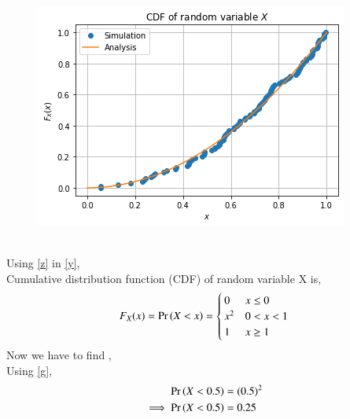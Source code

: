 \documentclass[journal,12pt,twocolumn]{IEEEtran}
\begin{document}
\begin{figure}[htp]
    \centering
    \includegraphics[width=\columnwidth]{assign2_1.png}
\end{figure}
\\Using \eqref{z} in \eqref{y},
\\Cumulative distribution function (CDF) of random variable X is,
\begin{align}
F_X(x)= \Pr\left(X<x\right)
= 
\begin{cases}
0 & x\leq0\\
x^2 & 0<x<1
\\
1 & x\geq1\label{g}\\
\end{cases}
\end{align}
Now we have to find ,\\
Using  \eqref{g},
\begin{align}
    \Pr\left(X<0.5\right) &= (0.5)^2\\
  \implies \Pr\left(X<0.5\right) &= 0.25
\end{align}
\end{document}
